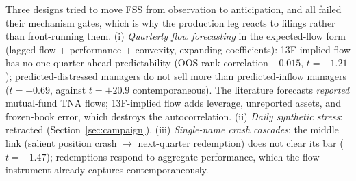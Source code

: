 Three designs tried to move FSS from observation to anticipation, and
all failed their mechanism gates, which is why the production leg
reacts to filings rather than front-running them.
(i) \emph{Quarterly flow forecasting} in the \citet{coval2007}
expected-flow form (lagged flow + performance + convexity, expanding
coefficients): 13F-implied flow has no one-quarter-ahead
predictability (OOS rank correlation $-0.015$, $t=-1.21$);
predicted-distressed managers do not sell more than predicted-inflow
managers ($t=+0.69$, against $t=+20.9$ contemporaneous). The
literature forecasts \emph{reported} mutual-fund TNA flows;
13F-implied flow adds leverage, unreported assets, and frozen-book
error, which destroys the autocorrelation. (ii) \emph{Daily
synthetic stress}: retracted (Section~\ref{sec:campaign}).
(iii) \emph{Single-name crash cascades}: the middle link (salient
position crash $\to$ next-quarter redemption) does not clear its
bar ($t=-1.47$); redemptions respond to aggregate performance, which
the flow instrument already captures contemporaneously.
